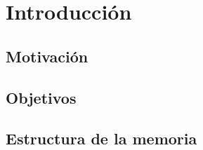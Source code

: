 \chapter{Introducción}
\section{Motivación}
\section{Objetivos}
\section{Estructura de la memoria}

\lipsum[1-3]
